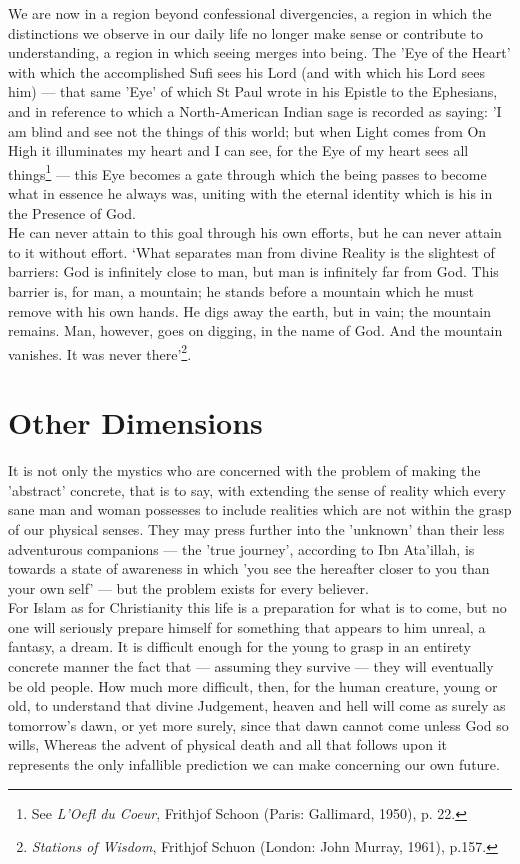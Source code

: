 \documentclass[10pt, twoside]{book}
\begin{document}
We are now in a region beyond confessional divergencies, a region in which the distinctions we 
observe in our daily life no longer make sense or contribute to understanding, a region in which 
seeing merges into being. The 'Eye of the Heart' with which the accomplished Sufi sees his Lord (and 
with which his Lord sees him) --- that same 'Eye' of which St Paul wrote in his Epistle to the 
Ephesians, and in reference to which a North\hyp{}American Indian sage is recorded as saying: 'I am blind 
and see not the things of this world; but when Light comes from On High it illuminates my heart and I 
can see, for the Eye of my heart sees all things\footnote{See \emph{L'Oefl du Coeur}, Frithjof Schoon (Paris: Gallimard, 1950), p. 22.} --- this Eye becomes a gate through which the 
being passes to become what in essence he always was, uniting with the eternal identity which is his 
in the Presence of God. \\

He can never attain to this goal through his own efforts, but he can never attain to it without 
effort. `What separates man from divine Reality is the slightest of barriers: God is infinitely close 
to man, but man is infinitely far from God. This barrier is, for man, a mountain; he stands before a 
mountain which he must remove with his own hands. He digs away the earth, but in vain; the mountain 
remains. Man, however, goes on digging, in the name of God. And the mountain vanishes. It was never 
there'\footnote{\emph{Stations of Wisdom}, Frithjof Schuon (London: John Murray, 1961), p.157.}. \\


\chapter{Other Dimensions}

It is not only the mystics who are concerned with the problem of making the 'abstract' concrete, that 
is to say, with extending the sense of reality which every sane man and woman possesses to include 
realities which are not within the grasp of our physical senses. They may press further into the 
'unknown' than their less adventurous companions --- the 'true journey', according to Ibn Ata'illah, is 
towards a state of awareness in which 'you see the hereafter closer to you than your own self' --- but 
the problem exists for every believer. \\

For Islam as for Christianity this life is a preparation for what is to come, but no one will 
seriously prepare himself for something that appears to him unreal, a fantasy, a dream. It is 
difficult enough for the young to grasp in an entirety concrete manner the fact that --- assuming they 
survive --- they will eventually be old people. How much more difficult, then, for the human creature, 
young or old, to understand that divine Judgement, heaven and hell will come as surely as tomorrow's 
dawn, or yet more surely, since that dawn cannot come unless God so wills, Whereas the advent of 
physical death and all that follows upon it represents the only infallible prediction we can make 
concerning our own future. \\
\end{document}
